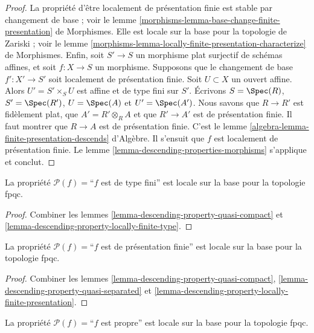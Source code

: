 \begin{proof}
La propriété d'être localement de présentation finie est stable par
changement de base ; voir le lemme
\ref{morphisms-lemma-base-change-finite-presentation} de Morphismes. Elle est locale sur la
base pour la topologie de Zariski ; voir le lemme
\ref{morphisms-lemma-locally-finite-presentation-characterize} de Morphismes. Enfin, soit
$S' \to S$ un morphisme plat surjectif de schémas affines, et soit
$f : X \to S$ un morphisme. Supposons que le changement de base
$f' : X' \to S'$ soit localement de présentation finie. Soit $U \subset X$
un ouvert affine. Alors $U' = S' \times_S U$ est affine et de type fini sur
$S'$. Écrivons $S = \Spec(R)$, $S' = \Spec(R')$, $U = \Spec(A)$ et
$U' = \Spec(A')$. Nous savons que $R \to R'$ est fidèlement plat, que
$A' = R' \otimes_R A$ et que $R' \to A'$ est de présentation finie. Il faut
montrer que $R \to A$ est de présentation finie. C'est le lemme
\ref{algebra-lemma-finite-presentation-descends} d'Algèbre. Il s'ensuit que $f$ est
localement de présentation finie. Le
lemme \ref{lemma-descending-properties-morphisms} s'applique et conclut.
\end{proof}

\begin{lemma}
\label{lemma-descending-property-finite-type}
La propriété $\mathcal{P}(f) =$``$f$ est de type fini''
est locale sur la base pour la topologie fpqc.
\end{lemma}

\begin{proof}
Combiner les lemmes \ref{lemma-descending-property-quasi-compact}
et \ref{lemma-descending-property-locally-finite-type}.
\end{proof}

\begin{lemma}
\label{lemma-descending-property-finite-presentation}
La propriété $\mathcal{P}(f) =$``$f$ est de présentation finie''
est locale sur la base pour la topologie fpqc.
\end{lemma}

\begin{proof}
Combiner les lemmes \ref{lemma-descending-property-quasi-compact},
\ref{lemma-descending-property-quasi-separated} et
\ref{lemma-descending-property-locally-finite-presentation}.
\end{proof}

\begin{lemma}
\label{lemma-descending-property-proper}
La propriété $\mathcal{P}(f) =$``$f$ est propre''
est locale sur la base pour la topologie fpqc.
\end{lemma}

